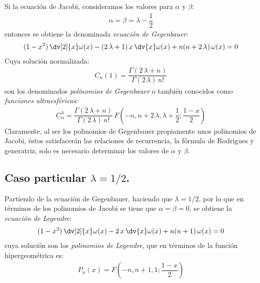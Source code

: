 Si la ecuación de Jacobi, consideramos los valores para $\alpha$ y $\beta$:
\begin{align*}
\alpha = \beta = \lambda - \dfrac{1}{2}
\end{align*}
entonces se obtiene la denominada \emph{ecuación de Gegenbauer}:
\begin{align*}
(1 - x^{2}) \, \dv[2]{x} \omega (x) - (2 \, \lambda + 1) \, x \, \dv{x} \omega (x) +  n(n + 2 \, \lambda) \, \omega (x) = 0
\end{align*}
Cuya solución normalizada:
\begin{align*}
C_{n} (1) = \dfrac{\Gamma (2 \, \lambda + n)}{\Gamma (2 \, \lambda) \, n!}
\end{align*}
son los denominados \emph{polinomios de Gegenbauer} o también conocidos como \emph{funciones ultraesféricas}:
\begin{align*}
C_{n}^{\lambda} = \dfrac{\Gamma (2 \, \lambda + n)}{\Gamma (2 \, \lambda) \, n!} \, F \left( -n, n + 2 \, \lambda, \lambda + \dfrac{1}{2}; \dfrac{1 - x}{2} \right)
\end{align*}
Claramente, al ser los polinomios de Gegenbauer propiamente unos polinomios de Jacobi, éstos satisfacerán las relaciones de recurrencia, la fórmula de Rodrigues y generatriz, solo es necesario determinar los valores de $\alpha$ y $\beta$.

\subsection{Caso particular \texorpdfstring{$\lambda = 1/2$}{}.}

Partiendo de la ecuación de Gegenbauer, haciendo que $\lambda = 1/2$, por lo que en términos de los polinomios de Jacobi se tiene que $\alpha = \beta = 0$, se obtiene la \emph{ecuación de Legendre}:
\begin{align*}
(1 - x^{2}) \, \dv[2]{x} \omega(x) - 2 \, x \, \dv{x} \omega (x) + n(n + 1) \, \omega (x) = 0
 \end{align*}
cuya solución son los \emph{polinomios de Legendre}, que en términos de la función hipergeométrica es:
\begin{align*}
P_{n} (x) =  F \left( -n, n + 1, 1; \dfrac{1 - x}{2} \right)
\end{align*}
